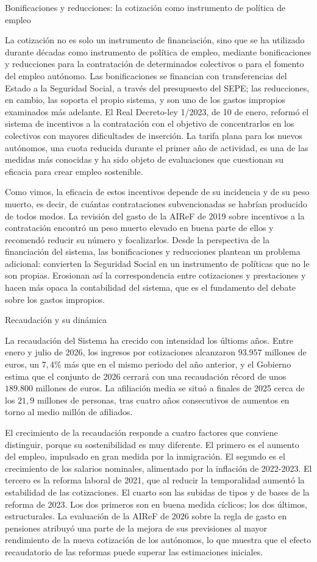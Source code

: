 \documentclass[10pt,a4paper]{article}
\begin{document}
Bonificaciones y reducciones: la cotización como instrumento de política de empleo

La cotización no es solo un instrumento de financiación, sino que se ha utilizado durante décadas como instrumento de política de empleo, mediante bonificaciones y reducciones para la contratación de determinados colectivos o para el fomento del empleo autónomo. Las bonificaciones se financian con transferencias del Estado a la Seguridad Social, a través del presupuesto del SEPE; las reducciones, en cambio, las soporta el propio sistema, y son uno de los gastos impropios examinados más adelante. El Real Decreto-ley 1/2023, de 10 de enero, reformó el sistema de incentivos a la contratación con el objetivo de concentrarlos en los colectivos con mayores dificultades de inserción. La tarifa plana para los nuevos autónomos, una cuota reducida durante el primer año de actividad, es una de las medidas más conocidas y ha sido objeto de evaluaciones que cuestionan su eficacia para crear empleo sostenible.

Como vimos, la eficacia de estos incentivos depende de su incidencia y de su peso muerto, es decir, de cuántas contrataciones subvencionadas se habrían producido de todos modos. La revisión del gasto de la AIReF de 2019 sobre incentivos a la contratación encontró un peso muerto elevado en buena parte de ellos y recomendó reducir su número y focalizarlos. Desde la perspectiva de la financiación del sistema, las bonificaciones y reducciones plantean un problema adicional: convierten la Seguridad Social en un instrumento de políticas que no le son propias. Erosionan así la correspondencia entre cotizaciones y prestaciones y hacen más opaca la contabilidad del sistema, que es el fundamento del debate sobre los gastos impropios.

Recaudación y su dinámica

La recaudación del Sistema ha crecido con intensidad los últioms años. Entre enero y julio de 2026, los ingresos por cotizaciones alcanzaron $93.957$ millones de euros, un $7,4\%$ más que en el mismo periodo del año anterior, y el Gobierno estima que el conjunto de 2026 cerrará con una recaudación récord de unos $189.800$ millones de euros. La afiliación media se situó a finales de 2025 cerca de los $21,9$ millones de personas, tras cuatro años consecutivos de aumentos en torno al medio millón de afiliados. 

El crecimiento de la recaudación responde a cuatro factores que conviene distinguir, porque su sostenibilidad es muy diferente. El primero es el aumento del empleo, impulsado en gran medida por la inmigración. El segundo es el crecimiento de los salarios nominales, alimentado por la inflación de 2022-2023. El tercero es la reforma laboral de 2021, que al reducir la temporalidad aumentó la estabilidad de las cotizaciones. El cuarto son las subidas de tipos y de bases de la reforma de 2023. Los dos primeros son en buena medida cíclicos; los dos últimos, estructurales. La evaluación de la AIReF de 2026 sobre la regla de gasto en pensiones atribuyó una parte de la mejora de sus previsiones al mayor rendimiento de la nueva cotización de los autónomos, lo que muestra que el efecto recaudatorio de las reformas puede superar las estimaciones iniciales.
\end{document}
